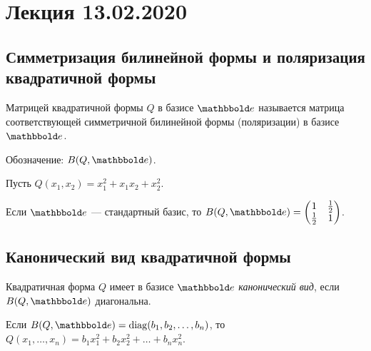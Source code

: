 \section{Лекция 13.02.2020}

\subsection{Симметризация билинейной формы и поляризация квадратичной формы}

\begin{definition}
    Матрицей квадратичной формы $Q$ в базисе $\E$ называется матрица соответствующей симметричной билинейной формы (поляризации) в базисе $\E$.

    Обозначение: $B(Q, \E)$.
\end{definition}

\begin{example}
    Пусть $Q(x_1, x_2) = x_1^2 + x_1 x_2 + x_2^2$.

    Если $\E$ --- стандартный базис, то $B(Q, \E) = \begin{pmatrix} 1 & \frac{1}{2} \\ \frac{1}{2} & 1 \end{pmatrix}$.
\end{example}


\subsection{Канонический вид квадратичной формы}

\begin{definition}
    Квадратичная форма $Q$ имеет в базисе $\E$ \textit{канонический вид}, если $B(Q, \E)$ диагональна.

    Если $B(Q, \E) = \diag(b_1, b_2, \dots, b_n)$, то $Q(x_1, \dots, x_n) = b_1 x_1^2 + b_2 x_2^2 + \dots + b_n x_n^2$.
\end{definition}


